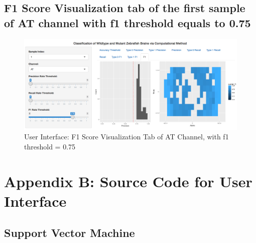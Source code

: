 \documentclass[10pt,letterpaper]{article}
\begin{document}
\subsection{F1 Score Visualization tab of the first sample of AT channel
with f1 threshold equals to
0.75}\label{f1-score-visualization-tab-of-the-first-sample-of-at-channel-with-f1-threshold-equals-to-0.75}

\begin{figure}[h]

{\centering \includegraphics[width=4.9in]{figures/shiny7} 

}

\caption{User Interface: F1 Score Visualization Tab of AT Channel, with f1 threshold = 0.75}\label{fig:shiny7}
\end{figure}

\newpage

\section{Appendix B: Source Code for User
Interface}\label{appendix-b-source-code-for-user-interface}

\subsection{Support Vector Machine}\label{support-vector-machine-1}
\end{document}
